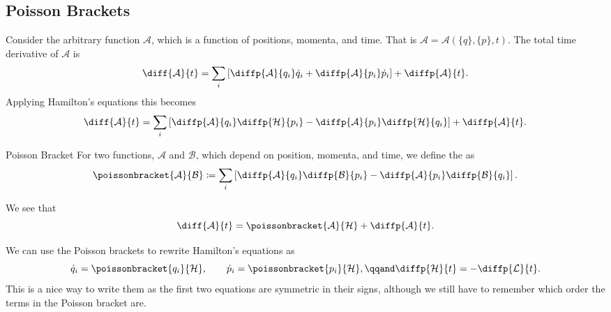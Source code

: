 \documentclass[fleqn]{NotesClass}
\newcommand*{\lagrangian}{\mathcal{L}}
\newcommand*{\hamiltonian}{\mathcal{H}}
\begin{document}
    \subsection{Poisson Brackets}
    Consider the arbitrary function \(\mathcal{A}\), which is a function of positions, momenta, and time.
    That is \(\mathcal{A} = \mathcal{A}(\{q\}, \{p\}, t)\).
    The total time derivative of \(\mathcal{A}\) is
    \begin{equation}
        \diff{\mathcal{A}}{t} = \sum_i \left[ \diffp{\mathcal{A}}{q_i}\dot{q}_i + \diffp{\mathcal{A}}{p_i}\dot{p}_i \right] + \diffp{\mathcal{A}}{t}.
    \end{equation}
    Applying Hamilton's equations this becomes
    \begin{equation}
        \diff{\mathcal{A}}{t} = \sum_i \left[ \diffp{\mathcal{A}}{q_i}\diffp{\hamiltonian}{p_i} - \diffp{\mathcal{A}}{p_i}\diffp{\hamiltonian}{q_i} \right] + \diffp{\mathcal{A}}{t}.
    \end{equation}
    
    \begin{dfn}{Poisson Bracket}{}
        For two functions, \(\mathcal{A}\) and \(\mathcal{B}\), which depend on position, momenta, and time, we define the  as
        \begin{equation}
            \poissonbracket{\mathcal{A}}{\mathcal{B}} \coloneqq \sum_i \left[ \diffp{\mathcal{A}}{q_i}\diffp{\mathcal{B}}{p_i} - \diffp{\mathcal{A}}{p_i}\diffp{\mathcal{B}}{q_i} \right].
        \end{equation}
    \end{dfn}

    We see that 
    \begin{equation}\label{eqn:dA/dt = poisson bracket}
        \diff{\mathcal{A}}{t} = \poissonbracket{\mathcal{A}}{\hamiltonian} + \diffp{\mathcal{A}}{t}.
    \end{equation}
    
    We can use the Poisson brackets to rewrite Hamilton's equations as
    \begin{equation}
        \dot{q}_i = \poissonbracket{q_i}{\hamiltonian}, \qquad \dot{p}_i = \poissonbracket{p_i}{\hamiltonian}, \qqand \diffp{\hamiltonian}{t} = - \diffp{\lagrangian}{t}.
    \end{equation}
    This is a nice way to write them as the first two equations are symmetric in their signs, although we still have to remember which order the terms in the Poisson bracket are.
    
\end{document}
